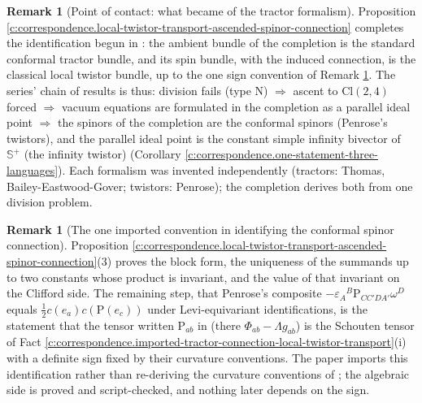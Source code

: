 \documentclass[11pt]{article}
\theoremstyle{definition}
\newtheorem{remark}[theorem]{Remark}
\theoremstyle{plain}
\newcommand{\changedmark}[2]{\marginpar{\raggedright\scriptsize\color{#1}#2}}
\providecommand{\CS}{}\renewcommand{\CS}{{\mathbb{S}^{+}}}
\providecommand{\Cl}{}\renewcommand{\Cl}{\mathrm{Cl}}
\begin{document}
\begin{remark}[Point of contact: what became of the tractor formalism]\label{c:note.correspondence.point-contact-what-became-tractor-formalism}
\changedmark{gray}{reworded}
Proposition \ref{c:correspondence.local-twistor-transport-ascended-spinor-connection} completes the identification begun in \cite{ButlerT6}: the ambient bundle of the completion is the standard conformal tractor bundle, and its spin bundle, with the induced connection, is the classical local twistor bundle, up to the one sign convention of Remark \ref{c:note.correspondence.one-imported-convention-local-twistor-identification}. The series' chain of results is thus: division fails (type N) $\Rightarrow$ ascent to $\Cl(2,4)$ forced \cite{ButlerT1} $\Rightarrow$ vacuum equations are formulated in the completion as a parallel ideal point \cite{ButlerT6} $\Rightarrow$ the spinors of the completion are the conformal spinors (Penrose's twistors), and the parallel ideal point is the constant simple infinity bivector of $\CS$ (the infinity twistor) (Corollary \ref{c:correspondence.one-statement-three-languages}). Each formalism was invented independently (tractors: Thomas, Bailey-Eastwood-Gover; twistors: Penrose); the completion derives both from one division problem.
\end{remark}

\begin{remark}[The one imported convention in identifying the conformal spinor connection]\label{c:note.correspondence.one-imported-convention-local-twistor-identification}
Proposition \ref{c:correspondence.local-twistor-transport-ascended-spinor-connection}(3) proves the block form, the uniqueness of the summands up to two constants whose product is invariant, and the value of that invariant on the Clifford side. The remaining step, that Penrose's composite $-\varepsilon_A{}^B\mathrm{P}_{CC'DA'}\omega^D$ equals $\tfrac12 c(e_a)c(\mathrm{P}(e_c))$ under Levi-equivariant identifications, is the statement that the tensor written $\mathrm{P}_{ab}$ in \cite{PenroseRindler86} (there $\Phi_{ab} - \Lambda g_{ab}$) is the Schouten tensor of Fact \ref{c:correspondence.imported-tractor-connection-local-twistor-transport}(i) with a definite sign fixed by their curvature conventions. The paper imports this identification rather than re-deriving the curvature conventions of \cite{PenroseRindler86}; the algebraic side is proved and script-checked, and nothing later depends on the sign.
\end{remark}
\end{document}
